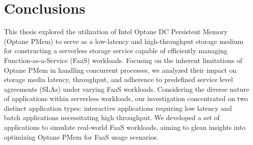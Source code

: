 


\chapter{Conclusions}

This thesis explored the utilization of Intel Optane DC Persistent Memory (Optane PMem) to serve as a low-latency and high-throughput storage medium for constructing a serverless storage service capable of efficiently managing Function-as-a-Service (FaaS) workloads. Focusing on the inherent limitations of Optane PMem in handling concurrent processes, we analyzed their impact on storage media latency, throughput, and adherence to predefined service level agreements (SLAs) under varying FaaS workloads. Considering the diverse nature of applications within serverless workloads, our investigation concentrated on two distinct application types: interactive applications requiring low latency and batch applications necessitating high throughput. We developed a set of applications to simulate real-world FaaS workloads, aiming to glean insights into optimizing Optane PMem for FaaS usage scenarios.

